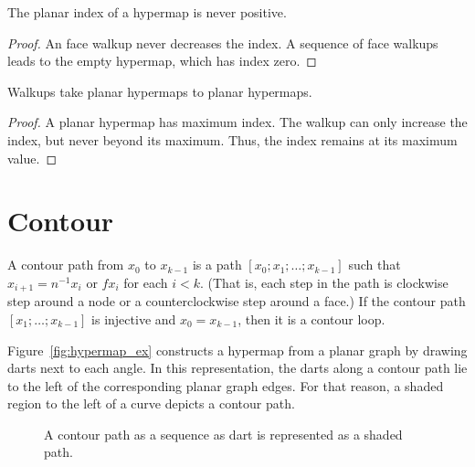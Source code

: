 \begin{lemma}  
The planar index
of a hypermap is never positive.
\end{lemma}

\begin{proof}  An face walkup never decreases the index.  A sequence
of face walkups leads to the empty hypermap, which has
index zero.
\end{proof}


\begin{lemma}
Walkups take planar hypermaps to planar
hypermaps.
\end{lemma}

\begin{proof}  
A planar hypermap has maximum index.  The walkup
can only increase the index, but never beyond its maximum.  
Thus, the index remains at its maximum value.
\end{proof}





\section{Contour}


\begin{definition} A contour path from
$x_0$ to $x_{k-1}$ is a path $[x_0;x_1;\ldots;x_{k-1}]$ such that
$x_{i+1} = n^{-1} x_i$ or $f x_i$ for each $i<k$.  (That is, each
step in the path is clockwise step around a node or a
counterclockwise step around a face.)  If the contour path
$[x_1;\ldots;x_{k-1}]$ is injective and $x_0 = x_{k-1}$, then it is
a contour loop.  %
%
%
\end{definition}

\begin{remark} Figure~\ref{fig:hypermap_ex} constructs a hypermap from
a planar graph by drawing darts next to each angle.  In this
representation, the darts along a contour path lie to the left of
the corresponding planar graph edges.  For that reason, a shaded
region to the left of a curve depicts a contour path.
\end{remark}

\begin{figure}[htb]
\centering
{}
\caption{A contour path as a sequence as dart is represented as a
shaded path.}
\label{fig:shade-dart}
\end{figure}

